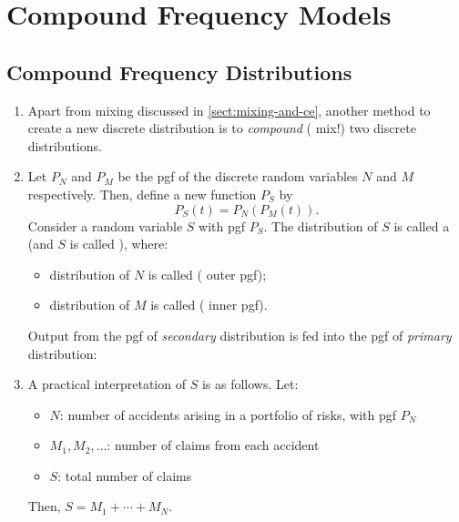 \section{Compound Frequency Models}
\label{sect:cpd-freq-model}
\subsection{Compound Frequency Distributions}
\begin{enumerate}
\item Apart from mixing discussed in \cref{sect:mixing-and-ce}, another method
to create a new discrete distribution is to \emph{compound} (
mix!) two discrete distributions.

\item \label{it:cpd-dist-s}
Let \(P_N\) and \(P_M\) be the pgf of the discrete random variables \(N\)
and \(M\) respectively. Then, define a new function \(P_S\) by
\[
P_S(t)=P_N(P_M(t)).
\]
Consider a random variable \(S\) with pgf \(P_S\). The distribution of \(S\) is
called a  (and \(S\) is called ), where:
\begin{itemize}
\item distribution of \(N\) is called  ( outer pgf);
\item distribution of \(M\) is called  ( inner pgf).
\end{itemize}
\begin{mnemonic}
Output from the pgf of \emph{secondary} distribution is fed into the pgf of
\emph{primary} distribution:
\begin{center}
\end{center}
\end{mnemonic}
\item \label{it:cpd-dist-as-total-claims}
A practical interpretation of \(S\) is as follows. Let:
\begin{itemize}
\item \(N\): number of accidents arising in a portfolio of risks, with pgf \(P_N\)
\item \(M_1,M_2,\dotsc\): number of claims from each accident
\item \(S\): total number of claims
\end{itemize}
Then, \(S=M_1+\dotsb+M_N\).


\end{enumerate}
